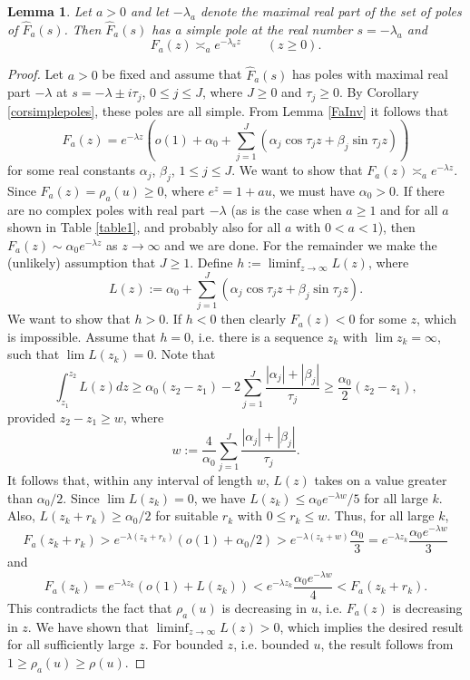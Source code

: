 \documentclass[11pt]{amsart}
\newtheorem{lemma}{Lemma}
\begin{document}
\begin{lemma}\label{lemag0}
Let $a>0$ and let $-\lambda_a$ denote the maximal real part of the set of poles of  $\widehat{F}_a(s)$.
Then $\widehat{F}_a(s)$ has a simple pole at the real number $s=-\lambda_a$ and $$F_a(z) \asymp_a e^{-\lambda_a z} \qquad (z\ge 0).$$
\end{lemma}

\begin{proof}
Let $a>0$ be fixed and assume that $\widehat{F}_a(s)$ has poles with maximal real part $-\lambda$ at $s=-\lambda \pm i\tau_j $, $0\le j \le J$,
where $J\ge 0$ and $\tau_j \ge 0$. 
By Corollary \ref{corsimplepoles}, these poles are all simple. 
From Lemma \ref{FaInv} it follows that 
$$
F_a(z) = e^{-\lambda z} \left( o(1) + \alpha_0 + \sum_{j=1}^J(\alpha_j \cos \tau_j z + \beta_j \sin \tau_j z) \right) 
$$ 
for some real constants $\alpha_j$, $\beta_j$, $1\le j \le J$. We want to show that $F_a(z) \asymp_a e^{-\lambda z} $.
Since $F_a(z)=\rho_a(u)\ge 0$, where $e^z=1+au$, we must have $\alpha_0>0$. 
If there are no complex poles with real part $-\lambda$ (as is the case when $a\ge 1$ and for all $a$ shown in Table \ref{table1}, 
and probably also for all $a$ with $0<a<1$),
 then $F_a(z) \sim \alpha_0 e^{-\lambda z}$ as $z\to \infty$ and we are done. 
For the remainder we make the (unlikely) assumption that $J\ge 1$. 
Define $h:= \liminf_{z\to \infty} L(z)$, where
$$
L(z):=\alpha_0 + \sum_{j=1}^J(\alpha_j \cos \tau_j z + \beta_j \sin \tau_j z) .
$$
We want to show that $h>0$. 
If $h<0$ then clearly $F_a(z) <0$ for some $z$, which is impossible.
Assume that $h=0$, i.e.
there is a sequence $z_k$ with $\lim z_k = \infty$, such that $\lim L(z_k) = 0$.
Note that
$$
\int_{z_1}^{z_2} L(z) dz \ge \alpha_0 (z_2-z_1) -2 \sum_{j=1}^J \frac{|\alpha_j|+|\beta_j|}{\tau_j} \ge \frac{\alpha_0}{2}(z_2- z_1),
$$
provided 
$z_2-z_1\ge w$, where
$$w:= \frac{4}{\alpha_0} \sum_{j=1}^J \frac{|\alpha_j|+|\beta_j|}{\tau_j}.$$
It follows that, within any interval of length $w$,
$L(z)$ takes on a value greater than $\alpha_0/2$.
Since $\lim L(z_k) = 0$, we have $L(z_k) \le \alpha_0 e^{-\lambda w}/5$ for all large $k$. 
Also, $L(z_k+r_k) \ge  \alpha_0/2$ for suitable $r_k$ with $0\le r_k \le w$. Thus, for all large $k$,
$$
F_a(z_k+r_k)> e^{-\lambda (z_k+r_k)} (o(1) + \alpha_0/2) > e^{-\lambda (z_k+w)}\frac{\alpha_0}{3}
=  e^{-\lambda z_k} \frac{\alpha_0e^{-\lambda w} }{3}
$$
and
$$
F_a(z_k) =  e^{-\lambda z_k}(o(1)+L(z_k))<e^{-\lambda z_k}\frac{\alpha_0 e^{-\lambda w}}{4}< F_a(z_k+r_k).
$$
This contradicts the fact that $\rho_a(u)$ is decreasing in $u$, i.e. $F_a(z)$ is decreasing in $z$.
We have shown that $ \liminf_{z\to \infty} L(z)>0$, which implies the desired result for all sufficiently large $z$.
For bounded $z$, i.e. bounded $u$, the result follows from $1\ge \rho_a(u) \ge \rho(u)$. 
\end{proof}
\end{document}
